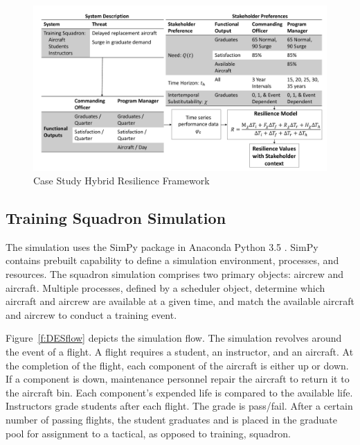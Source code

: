 \documentclass[preprint,12pt]{elsarticle}
\begin{document}
\begin{landscape}
\begin{figure}[h]
  \centering\includegraphics[width=8in]{FleetHybridModelDetailedEmb}
  \caption{Case Study Hybrid Resilience Framework}
  \label{f:FleetFramework}
\end{figure}
\end{landscape}


\subsection{Training Squadron Simulation}

The simulation uses the SimPy \cite{Scherfke2018} package in Anaconda
% 
% 
% 
% 
Python 3.5 \cite{Anaconda2016}. SimPy contains 
prebuilt capability to define a simulation environment, processes, and
resources. The squadron simulation comprises two primary objects: aircrew and
aircraft. Multiple processes, defined by a scheduler object, determine
which aircraft and aircrew are available at a given time, and match
the available aircraft and aircrew to conduct a training event.

Figure~\ref{f:DESflow} depicts the simulation flow. The simulation
revolves around the event of a flight.  A flight requires a student,
an instructor, and an aircraft. At the completion of the flight, each
component of the aircraft is either up or down. If a component is
down, maintenance personnel repair the aircraft to return it to the
aircraft bin. Each component's expended life is compared to the
available life. Instructors grade students after each flight. The
grade is pass/fail. After a certain number of passing flights, the
student graduates and is placed in the graduate pool for assignment to
a tactical, as opposed to training, squadron.
\end{document}
